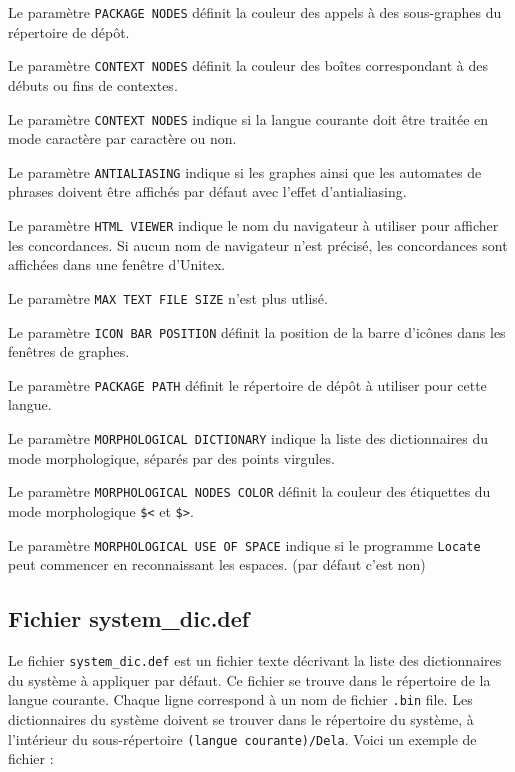 \bigskip
\noindent Le paramètre \verb+PACKAGE NODES+ définit la couleur des appels à des sous-graphes du
répertoire de dépôt.

\bigskip
\noindent Le paramètre \verb+CONTEXT NODES+ définit la couleur des boîtes correspondant à des débuts
ou fins de contextes.

\bigskip
\noindent Le paramètre \verb+CONTEXT NODES+ indique si la langue courante doit être traitée en mode
caractère par caractère ou non.

\bigskip
\noindent Le paramètre \verb+ANTIALIASING+ indique si les graphes ainsi que les automates de phrases
doivent être affichés par défaut avec l’effet d’antialiasing.

\bigskip
\noindent Le paramètre \verb+HTML VIEWER+ indique le nom du navigateur à utiliser pour afficher les
concordances. Si aucun nom de navigateur n’est précisé, les concordances sont affichées
dans une fenêtre d’Unitex.

\bigskip
\noindent Le paramètre \verb+MAX TEXT FILE SIZE+ n'est plus utlisé.

\bigskip
\noindent Le paramètre \verb+ICON BAR POSITION+ définit la position de la barre d’icônes dans les fenêtres de graphes.


\bigskip
\noindent Le paramètre \verb+PACKAGE PATH+ définit le répertoire de dépôt à utiliser pour cette langue.

\bigskip
\noindent Le paramètre \verb+MORPHOLOGICAL DICTIONARY+ indique la liste des dictionnaires du mode morphologique, séparés par des points virgules.

\bigskip
\noindent Le paramètre \verb+MORPHOLOGICAL NODES COLOR+ définit la couleur des étiquettes du mode morphologique \verb+$<+ et \verb+$>+.

\bigskip
\noindent Le paramètre \verb+MORPHOLOGICAL USE OF SPACE+ indique si le programme
\verb+Locate+ peut commencer en reconnaissant les espaces. (par défaut c'est non)


\subsection{Fichier system\_dic.def}
Le fichier \verb+system_dic.def+ est un fichier texte décrivant la liste des dictionnaires du
système à appliquer par défaut. Ce fichier se trouve dans le répertoire de la langue courante.
Chaque ligne correspond à un nom de fichier \verb+.bin+ file.                                                         Les dictionnaires du système doivent se trouver dans le répertoire du système, à l’intérieur du
sous-répertoire \verb+(langue courante)/Dela+.
Voici un exemple de fichier :


